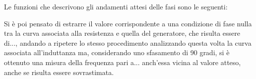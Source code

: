 Le funzioni che descrivono gli andamenti attesi delle fasi sono le seguenti:




Si è poi pensato di estrarre il valore corrispondente a una condizione di fase nulla tra la curva associata alla resistenza e quella del generatore, che risulta essere di..., andando a ripetere lo stesso procedimento analizzando questa volta la curva associata all’induttanza ma, considerando uno sfasamento di 90 gradi, si è ottenuto una misura della frequenza pari a... anch’essa vicina al valore atteso, anche se risulta essere sovrastimata.

